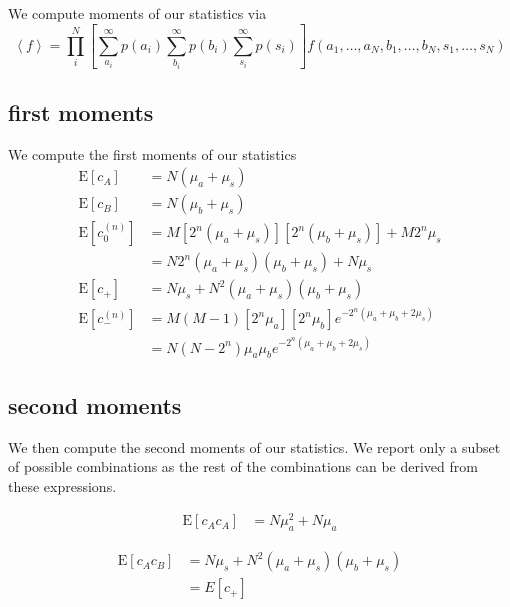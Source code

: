 \documentclass{article}
\begin{document}
We compute moments of our statistics via
\begin{equation}
    \left<f\right> = \prod\limits_i^N\left[ \sum_{a_i}^\infty p(a_i) \sum_{b_i}^\infty p(b_i) \sum_{s_i}^\infty p(s_i) \right] f(a_1, \ldots, a_N, b_1, \ldots, b_N, s_1, \ldots, s_N)
\end{equation}


\subsection*{first moments}
\label{sec:first moments}

We compute the first moments of our statistics
\begin{align}
    \mathrm{E}[c_A]
        &= N(\mu_a + \mu_s) \\
    \mathrm{E}[c_B]
        & = N(\mu_b + \mu_s) \\
    \mathrm{E}[c_0^{(n)}]
        & = M [2^n (\mu_a + \mu_s)] [2^n (\mu_b + \mu_s)] + M 2^n \mu_s \nonumber \\
        & = N 2^n (\mu_a + \mu_s)(\mu_b + \mu_s) + N \mu_s \\
    \mathrm{E}[c_+]
        & = N \mu_s + N^2 (\mu_a + \mu_s) (\mu_b + \mu_s) \\
    \mathrm{E}[c_{-}^{(n)}]
         & = M (M-1) [2^n \mu_a] [2^n \mu_b] e^{-2^n (\mu_a + \mu_b + 2\mu_s)} \nonumber \\
         & = N (N - 2^n) \mu_a \mu_b e^{-2^n (\mu_a + \mu_b + 2\mu_s)}
\end{align}


\subsection*{second moments}
\label{sec:second moments}

We then compute the second moments of our statistics.
We report only a subset of possible combinations as the rest of the combinations can be derived from these expressions.

\begin{align}
    \mathrm{E}[c_A c_A]
        & = N \mu_a^2 + N \mu_a
\end{align}

\begin{align}
    \mathrm{E}[c_A c_B]
        & = N \mu_s + N^2 (\mu_a + \mu_s)(\mu_b + \mu_s) \\
        & = E[c_+] \nonumber
\end{align}
\end{document}

